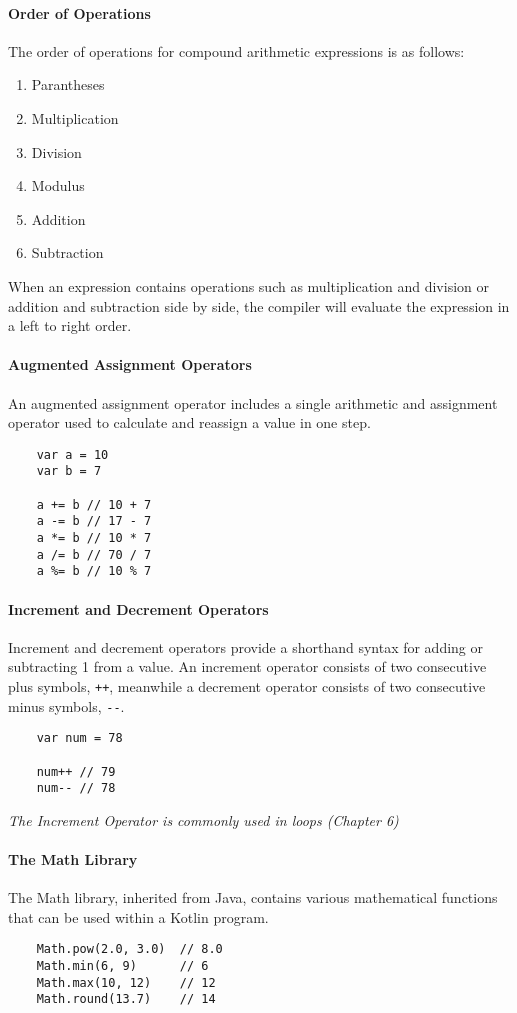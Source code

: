 \paragraph{Order of Operations}
The order of operations for compound arithmetic expressions is as follows:

\begin{enumerate}
    \item Parantheses
    \item Multiplication
    \item Division
    \item Modulus
    \item Addition
    \item Subtraction
\end{enumerate}


When an expression contains operations such as multiplication and division or addition and 
subtraction side by side, the compiler will evaluate the expression in a left to right order.

\paragraph{Augmented Assignment Operators}
An augmented assignment operator includes a single arithmetic and assignment operator used 
to calculate and reassign a value in one step.

\begin{verbatim}
    var a = 10
    var b = 7

    a += b // 10 + 7
    a -= b // 17 - 7
    a *= b // 10 * 7
    a /= b // 70 / 7
    a %= b // 10 % 7
\end{verbatim}

\paragraph{Increment and Decrement Operators}
Increment and decrement operators provide a shorthand syntax for adding or subtracting 1 from a value. 
An increment operator consists of two consecutive plus symbols, \verb!++!, meanwhile a decrement operator 
consists of two consecutive minus symbols, \verb!--!.

\begin{verbatim}
    var num = 78

    num++ // 79
    num-- // 78
\end{verbatim}

\textit{The Increment Operator is commonly used in loops (Chapter 6)}

\paragraph{The Math Library}
The Math library, inherited from Java, contains various mathematical 
functions that can be used within a Kotlin program.

\begin{verbatim}
    Math.pow(2.0, 3.0)  // 8.0
    Math.min(6, 9)      // 6 
    Math.max(10, 12)    // 12
    Math.round(13.7)    // 14
\end{verbatim}